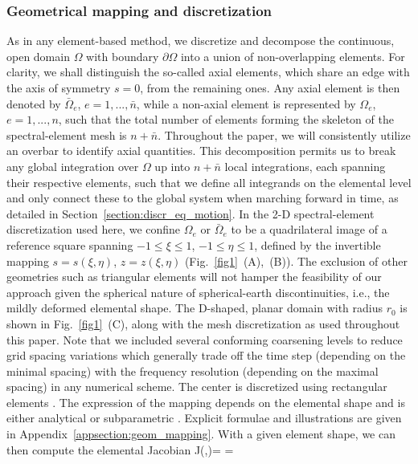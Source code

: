 \subsubsection{Geometrical mapping and discretization}\label{section:geometrical}
%
As in any element-based method, we discretize and decompose the continuous,
open domain $\Omega$ with boundary $\partial\Omega$
into a union of non-overlapping elements.
For clarity, we shall distinguish the so-called axial elements, which share an
edge with the axis of symmetry $s=0$, from the remaining ones. Any axial
element is then denoted by $\bar{\Omega}_{e}$, $e=1,...,\bar{n}$,
while a non-axial element is represented by $\Omega_e$, $e=1,...,n$, such that
the total number of elements forming the skeleton of the spectral-element
mesh is $n+\bar{n}$.
Throughout the paper, we will consistently utilize an overbar to
identify axial quantities. This decomposition permits us to break any global
integration over $\Omega$ up into $n+\bar{n}$ local integrations, each
spanning their respective elements, such that we define all integrands on
the elemental level and only connect these to the global system when
marching forward in time, as detailed in
Section~\ref{section:discr_eq_motion}.
In the 2-D spectral-element discretization used here, we confine $\Omega_e$ or
$\bar{\Omega}_{e}$ to be a quadrilateral image of a reference square
spanning $-1\le\xi\le 1$, $-1\le\eta\le 1$, defined by the invertible
mapping $s=s(\xi,\eta)$, $z=z(\xi,\eta)$ (Fig.~\ref{fig1}~(A),~(B)).
The exclusion of other geometries
such as triangular elements will not hamper the feasibility of our approach
given the spherical nature of spherical-earth discontinuities, i.e., the
mildly deformed elemental shape.
The D-shaped, planar domain with radius $r_0$ is shown in Fig.~\ref{fig1}~(C),
along with the mesh discretization as used throughout this paper.
Note that we included several conforming coarsening levels to
reduce grid spacing variations \citep{KoTr02a} which generally trade
off the time step (depending on the minimal spacing) with the frequency
resolution (depending on the maximal spacing) in any numerical scheme.
The center is discretized using rectangular elements \citep{manuthesis}.
The expression of the mapping depends on the elemental shape and is
either analytical or subparametric \citep{fournier04}. Explicit formulae and
illustrations are given in Appendix~\ref{appsection:geom_mapping}.
With a given element shape, we can then compute the elemental Jacobian
\eq \label{eq:jacob}
{\mathcal J}(\xi,\eta)=
=
